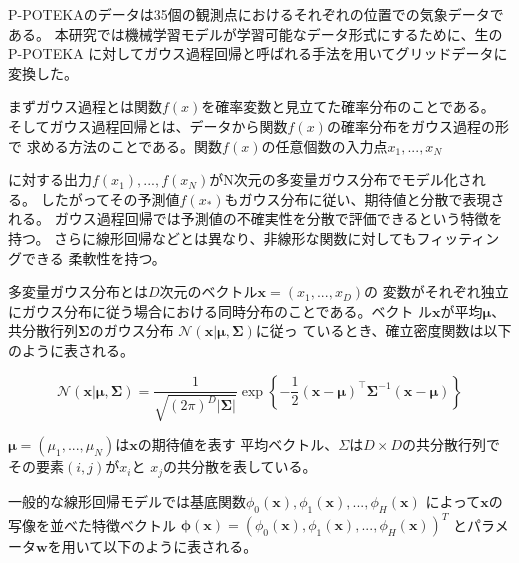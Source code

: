 P-POTEKAのデータは35個の観測点におけるそれぞれの位置での気象データである。
本研究では機械学習モデルが学習可能なデータ形式にするために、生のP-POTEKA
に対してガウス過程回帰と呼ばれる手法を用いてグリッドデータに変換した。

まずガウス過程とは関数$f(x)$を確率変数と見立てた確率分布のことである。
そしてガウス過程回帰とは、データから関数$f(x)$の確率分布をガウス過程の形で
求める方法のことである。関数$f(x)$の任意個数の入力点$x_{1}, ..., x_{N}$

に対する出力$f(x_{1}), ..., f(x_{N})$がN次元の多変量ガウス分布でモデル化される。
したがってその予測値$f(x_{*})$もガウス分布に従い、期待値と分散で表現される。
ガウス過程回帰では予測値の不確実性を分散で評価できるという特徴を持つ。
さらに線形回帰などとは異なり、非線形な関数に対してもフィッティングできる
柔軟性を持つ。

多変量ガウス分布とは$D$次元のベクトル$\boldsymbol{x} = (x_{1}, ..., x_{D})$の
変数がそれぞれ独立にガウス分布に従う場合における同時分布のことである。ベクト
ル$\boldsymbol{x}$が平均$\boldsymbol{\mu}$、共分散行列$\boldsymbol{\Sigma}$のガウス分布
$\mathcal{N}(\boldsymbol{x} | \boldsymbol{\mu}, \boldsymbol{\Sigma})$に従っ
ているとき、確立密度関数は以下のように表される。

\begin{equation}
\label{eq:multivariate-dist}
\mathcal{N}(\mathbf{x} | \boldsymbol{\mu}, \boldsymbol{\Sigma})
    = \frac{1}{\sqrt{(2 \pi)^D |\boldsymbol{\Sigma}|}}
      \exp \left\{
          - \frac{1}{2}
            (\mathbf{x} - \boldsymbol{\mu})^{\top}
            \boldsymbol{\Sigma}^{-1}
            (\mathbf{x} - \boldsymbol{\mu})
      \right\}
\end{equation}

$\boldsymbol{\mu} = (\mu_{1}, ..., \mu_{N})$は$\boldsymbol{x}$の期待値を表す
平均ベクトル、$\Sigma$は$D \times D$の共分散行列でその要素$(i, j)$が$x_{i}$と
$x_{j}$の共分散を表している。

一般的な線形回帰モデルでは基底関数$\phi_{0}(\boldsymbol{x}), \phi_{1}(\boldsymbol{x}), ..., \phi_{H}(\boldsymbol{x})$
によって$\boldsymbol{x}$の写像を並べた特徴ベクトル
$\boldsymbol{\phi}(\boldsymbol{x}) = (\phi_{0}(\boldsymbol{x}), \phi_{1}(\boldsymbol{x}), ..., \phi_{H}(\boldsymbol{x}))^T$
とパラメータ$\boldsymbol{w}$を用いて以下のように表される。

